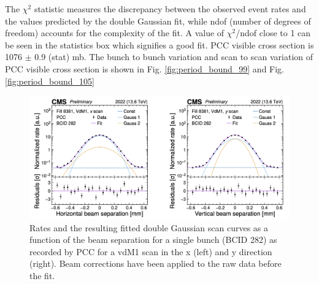 The $\chi^2$ statistic measures the discrepancy between the observed event rates and the values predicted by the double Gaussian fit, while ndof (number of degrees of freedom) accounts for the complexity of the fit. A value of  $\chi^2$/ndof close to 1 can be seen in the statistics box which signifies a good fit. PCC visible cross section is 1076 $\pm$ 0.9 (stat) mb. The bunch to bunch variation and scan to scan variation of PCC visible cross section is shown in Fig. \ref{fig:period_bound_99} and Fig. \ref{fig:period_bound_105} \cite{pas_22} %


\begin{figure}[!htp]
\centering
\includegraphics[width=1\textwidth]{ashish_thesis/2022_PCC_vdM_fit_new.png}
\caption[2022 PCC vdM Fit]{%
  Rates and the resulting fitted double Gaussian scan curves as a function of the beam separation for a single bunch (BCID 282) as recorded by PCC for a vdM1 scan in the x (left) and y direction (right). Beam corrections have been applied to the raw data before the fit.
}
\label{fig:period_bound_50}
\end{figure}

